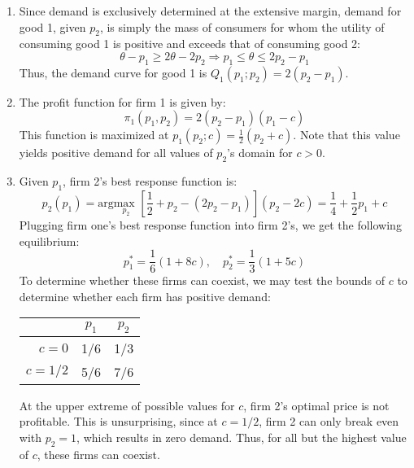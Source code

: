 \documentclass{article}
\newcommand{\usmax}[1]{\underset{#1}{\text{max }}}
\begin{document}
\begin{enumerate}
\begin{enumerate}
    \item Since demand is exclusively determined at the extensive margin, demand for good 1, given $p_2$, is simply the mass of consumers for whom the utility of consuming good 1 is positive and exceeds that of consuming good 2:\[
      \theta - p_1 \geq 2\theta - 2p_2  \Rightarrow p_1 \leq \theta \leq 2p_2 - p_1
    \]
    Thus, the demand curve for good 1 is ${Q_1(p_1; p_2) = 2(p_2 - p_1)}$.

    \item The profit function for firm 1 is given by:\[
      \pi_1(p_1, p_2) =  2(p_2-p_1)(p_1 - c)
    \]
    This function is maximized at ${p_1(p_2; c)=\frac{1}{2}(p_2 + c)}$. Note that this value yields positive demand for all values of $p_2$'s domain for $c>0$.

    \item Given $p_1$, firm 2's best response function is:\[
      p_2(p_1) = \text{arg}\usmax{p_2} \left[\frac{1}{2}+ p_2- (2p_2 - p_1)\right](p_2 - 2c) = \frac{1}{4} + \frac{1}{2}p_1 + c
    \]
    Plugging firm one's best response function into firm 2's, we get the following equilibrium:\[
      p_1^* = \frac{1}{6}(1 + 8c),\quad p_2^* = \frac{1}{3}(1 + 5c)
    \]
    To determine whether these firms can coexist, we may test the bounds of $c$ to determine whether each firm has positive demand:
    \begin{center}
      \begin{tabular}{r|cc}
        &         $p_1$ & $p_2$ \\\hline 
        $c=0$   & 1/6   & 1/3   \\
        $c=1/2$ & 5/6   & 7/6    
      \end{tabular}
    \end{center}
    At the upper extreme of possible values for $c$, firm 2's optimal price is not profitable. This is unsurprising, since at ${c=1/2}$, firm 2 can only break even with ${p_2=1}$, which results in zero demand. Thus, for all but the highest value of $c$, these firms can coexist.
  \end{enumerate}
\end{enumerate}

\end{document}
